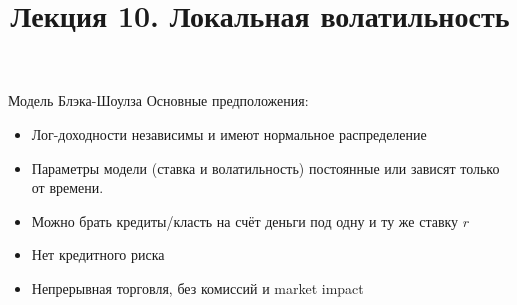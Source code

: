 \documentclass{beamer}
\title[Модели стохастической волатильности]{Лекция 10. Локальная волатильность} %
\begin{document}
\begin{frame}
\titlepage 
\end{frame}

\begin{frame}{Модель Блэка-Шоулза}
    Основные предположения:
    \begin{itemize}
        \item Лог-доходности независимы и имеют нормальное распределение
        \item Параметры модели (ставка и волатильность) постоянные или зависят только от времени.
        \item Можно брать кредиты/класть на счёт деньги под одну и ту же ставку $r$
        \item Нет кредитного риска
        \item Непрерывная торговля, без комиссий и market impact
    \end{itemize}
\end{frame}
\end{document}
